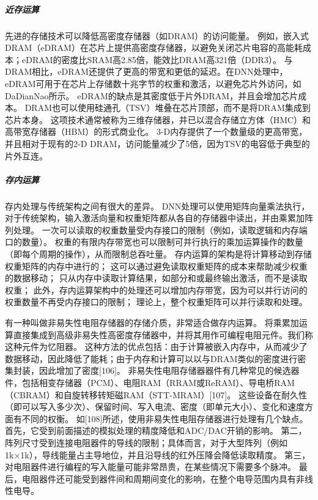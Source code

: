 \subparagraph{近存运算}


先进的存储技术可以降低高密度存储器（如DRAM）的访问能量。
例如，嵌入式DRAM（eDRAM）\cite{2001Embedded}在芯片上提供高密度存储器，以避免关闭芯片电容的高能耗成本；eDRAM的密度比SRAM高2.85倍，能效比DRAM高321倍（DDR3）\cite{2017Efficient}。
与DRAM相比，eDRAM还提供了更高的带宽和更低的延迟。在DNN处理中，eDRAM可用于在芯片上存储数十兆字节的权重和激活，以避免芯片外访问，如DaDianNao\cite{2015DaDianNao}所示。
eDRAM的缺点是其密度低于片外DRAM，并且会增加芯片成本。
DRAM也可以使用硅通孔（TSV）\cite{2018The}堆叠在芯片顶部，而不是将DRAM集成到芯片本身。
这项技术通常被称为三维存储器，并已以混合存储立方体（HMC）\cite{2012Hybrid}和高带宽存储器（HBM）\cite{HBMDRAM}的形式商业化。
3-D内存提供了一个数量级的更高带宽，并且相对于现有的2-D DRAM，访问能量减少了5倍，因为TSV的电容低于典型的片外互连\cite{2017Efficient}。

\subparagraph{存内运算}
存内处理与传统架构之间有很大的差异。
DNN处理可以使用矩阵向量乘法执行，
对于传统架构，输入激活向量和权重矩阵都从各自的存储器中读出，并由乘累加阵列处理。
一次可以读取的权重数量受内存接口的限制（例如，读取逻辑和内存端口的数量）。
权重的有限内存带宽也可以限制可并行执行的乘加运算操作的数量（即每个周期的操作），从而限制总吞吐量。
存内运算的架构是将计算移动到存储权重矩阵的内存中进行的；
这可以通过避免读取权重矩阵的成本来帮助减少权重的数据移动；
只从内存中读取计算结果，如部分和或最终输出激活，而不是读取权重；
此外，存内运算架构中的处理还可以增加内存带宽，因为可以并行访问的权重数量不再受内存接口的限制；
理论上，整个权重矩阵可以并行读取和处理\cite{2017Efficient}。  

有一种叫做非易失性电阻存储器的存储介质，非常适合做存内运算。
将乘累加运算直接集成到高级非易失性高密度存储器中，并将其用作可编程电阻元件。我们称这种元件为忆阻器\cite{IEEE1971L}。
这种方法的优点包括：由于计算被嵌入内存中，从而减少了数据移动，因此降低了能耗；由于内存和计算可以以与DRAM类似的密度进行密集封装，因此增加了密度[106]。
非易失性电阻存储器器件有几种常见的候选器件，包括相变存储器（PCM）、电阻RAM（RRAM或ReRAM）、导电桥RAM（CBRAM）和自旋转移转矩磁RAM（STT-MRAM）[107]。
这些设备在耐久性（即可以写入多少次）、保留时间、写入电流、密度（即单元大小）、变化和速度方面有不同的权衡。
如[108]所述，使用非易失性电阻存储器进行处理有几个缺点。
首先，它受到前面描述的模拟处理的精度降低和ADC/DAC开销的影响。
第二，阵列尺寸受到连接电阻器件的导线的限制；具体而言，对于大型阵列（例如1k×1k），导线能量占主导地位，并且沿导线的红外压降会降低读取精度。
第三，对电阻器件进行编程的写入能量可能非常昂贵，在某些情况下需要多个脉冲。
最后，电阻器件还可能受到器件间和周期间变化的影响，在整个电导范围内具有非线性电导。


